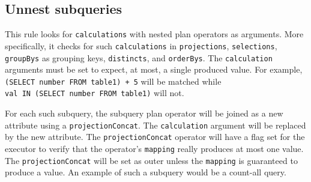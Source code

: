 \subsection{Unnest subqueries}
\label{subsec:unnest-subqueries}

This rule looks for \texttt{calculations} with nested plan operators as arguments. More specifically, it checks for such \texttt{calculations} in \texttt{projections}, \texttt{selections}, \texttt{groupBys} as grouping keys, \texttt{distincts}, and \texttt{orderBys}. The \texttt{calculation} arguments must be set to expect, at most, a single produced value. For example, \texttt{(SELECT number FROM table1) + 5} will be matched while \\\texttt{val IN (SELECT number FROM table1)} will not.

For each such subquery, the subquery plan operator will be joined as a new attribute using a \texttt{projectionConcat}. The \texttt{calculation} argument will be replaced by the new attribute. The \texttt{projectionConcat} operator will have a flag set for the executor to verify that the operator's \texttt{mapping} really produces at most one value. The \texttt{projectionConcat} will be set as outer unless the \texttt{mapping} is guaranteed to produce a value. An example of such a subquery would be a count-all query.

